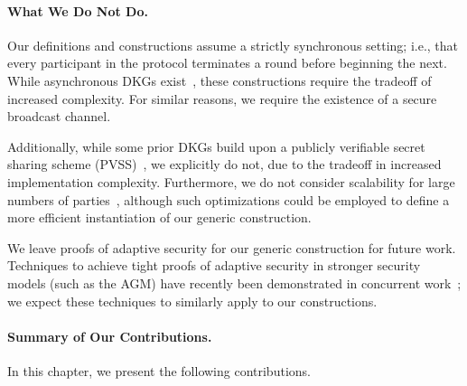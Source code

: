 \paragraph{What We Do Not Do.}
Our definitions and constructions assume a strictly synchronous setting;
i.e., that every participant in the protocol terminates a round before beginning the next.
While asynchronous DKGs
exist~\cite{NejiBR16,DasYXMKR21,AbrahamJMMST21,Kokoris-KogiasM20,KateHG12,YurekLFKM22},
these constructions require the tradeoff of increased complexity.
For similar reasons, we require the existence of a secure broadcast channel.

Additionally, while some prior DKGs build upon a publicly verifiable secret
sharing scheme (PVSS)~\cite{Groth21,BonehS2020},
we explicitly do not,
due to the tradeoff in increased implementation complexity.
Furthermore,
we do not consider scalability for large numbers of parties~\cite{CannyS04,ZhangXHSZ22,YurekLFKM22},
although such optimizations
could be employed to define a more efficient instantiation of our
generic construction.

We leave proofs of adaptive security for our generic construction for future work.
Techniques to achieve tight proofs of adaptive security in stronger security
models (such as the AGM) have recently been demonstrated in concurrent work~\cite{BachoL22,AbrahamJMMS2022};
we expect these techniques to similarly apply to our constructions.




\paragraph{Summary of Our Contributions.}
In this chapter, we present the following contributions.

